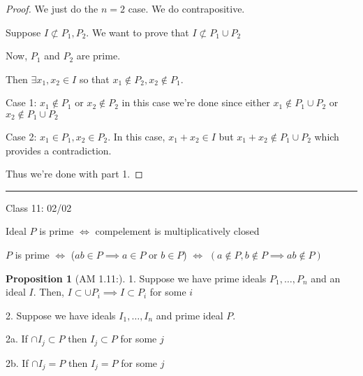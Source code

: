\documentclass{article}
\theoremstyle{definition}
\newtheorem{proposition}{Proposition}
\begin{document}
\begin{proof}
    We just do the \(n=2\) case. We do contrapositive.

    Suppose \(I\not\subset P_1,P_2\). We want to prove that \(I\not\subset P_1\cup P_2\) 

    Now, \(P_1\) and \(P_2\) are prime.

    Then \(\exists x_1,x_2\in I\) so that \(x_1\notin P_2,x_2\notin P_1\). 

    Case 1: \(x_1\notin P_1\) or \(x_2\notin P_2\) in this case we're done since either \(x_1\notin P_1\cup P_2\) or \(x_2\notin P_1\cup P_2\) 

    Case 2: \(x_1\in P_1,x_2\in P_2\). In this case, \(x_1 + x_2 \in I\) but \(x_1 + x_2 \notin P_1\cup P_2\) which provides a contradiction.

    Thus we're done with part 1.

\end{proof}

\hfil
\hrule

Class 11: 02/02

Ideal \(P\) is prime \(\iff \) compelement is multiplicatively closed

\(P\) is prime \(\iff \) (\(ab\in P \implies a\in P\) or \(b\in P\)) \(\iff \) \((a \notin P,b\notin P \implies ab \notin P)\) 

\begin{proposition}
    [AM 1.11:]

    1. Suppose we have prime ideals \(P_1, \dots, P_n \) and an ideal \(I\). Then, \(I \subset \cup P_i \implies I \subset P_i\) for some \(i\) 

    2. Suppose we have ideals \(I_1, \dots, I_n \) and prime ideal \(P\).
    
    2a. If \(\cap I_j \subset P\) then \(I_j \subset P\) for some \(j\) 

    2b. If \(\cap I_j = P\) then \(I_j = P\) for some \(j\)  

\end{proposition}
\end{document}
